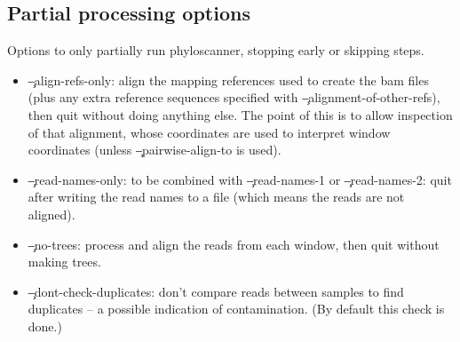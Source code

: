 \subsection{Partial processing options}
Options to only partially run phyloscanner, stopping early or skipping steps.
\begin{itemize}
 \item \c{--align-refs-only}: align the mapping references used to create the bam files (plus any extra reference sequences specified with \c{--alignment-of-other-refs}), then quit without doing anything
else.
The point of this is to allow inspection of that alignment, whose coordinates are used to interpret window coordinates (unless \c{--pairwise-align-to} is used).
\item \c{--read-names-only}: to be combined with \c{--read-names-1} or \c{--read-names-2}: quit after writing
the read names to a file (which means the reads are not aligned).
\item \c{--no-trees}: process and align the reads from each window, then quit without making trees.
\item \c{--dont-check-duplicates}: don't compare reads between samples to find duplicates -- a possible indication of contamination.
(By default this check is done.)
\end{itemize}


